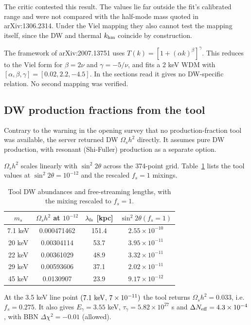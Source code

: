 \documentclass[11pt,a4paper]{article}
\begin{document}
The critic contested this result. The values lie far outside the fit's calibrated range and were not compared with the half-mode mass quoted in arXiv:1306.2314. Under the Viel mapping they also cannot test the mapping itself, since the DW and thermal $k_{\rm hm}$ coincide by construction.

The framework of arXiv:2007.13751 uses $T(k)=[1+(\alpha k)^\beta]^\gamma$. This reduces to the Viel form for $\beta=2\nu$ and $\gamma=-5/\nu$, and fits a 2 keV WDM with $[\alpha,\beta,\gamma]=[0.02,2.2,-4.5]$. In the sections read it gives no DW-specific relation. No second mapping was verified.

\subsection{DW production fractions from the tool}
Contrary to the warning in the opening survey that no production-fraction tool was available, the server returned DW $\Omega_s h^2$ directly. It assumes pure DW production, with resonant (Shi-Fuller) production as a separate option.

$\Omega_s h^2$ scales linearly with $\sin^2 2\theta$ across the 374-point grid. Table~\ref{tab:fs} lists the tool values at $\sin^2 2\theta=10^{-12}$ and the rescaled $f_s=1$ mixings.

\begin{table}[h]
\centering
\begin{tabular}{cccc}
\toprule
$m_s$ & $\Omega_s h^2$ at $10^{-12}$ & $\lambda_{\rm fs}$ [kpc] & $\sin^2 2\theta(f_s=1)$ \\
\midrule
7.1 keV & 0.000471462 & 151.4 & $2.55\times10^{-10}$ \\
20 keV & 0.00304114 & 53.7 & $3.95\times10^{-11}$ \\
22 keV & 0.00361029 & 48.9 & $3.32\times10^{-11}$ \\
29 keV & 0.00593606 & 37.1 & $2.02\times10^{-11}$ \\
45 keV & 0.0130907 & 23.9 & $9.17\times10^{-12}$ \\
\bottomrule
\end{tabular}
\caption{Tool DW abundances and free-streaming lengths, with the mixing rescaled to $f_s=1$.}
\label{tab:fs}
\end{table}

At the 3.5 keV line point $(7.1\ {\rm keV},\,7\times10^{-11})$ the tool returns $\Omega_s h^2=0.033$, i.e.\ $f_s=0.275$. It also gives $E_\gamma=3.55$ keV, $\tau_\gamma=5.82\times10^{27}$ s and $\Delta N_{\rm eff}=4.3\times10^{-4}$, with BBN $\Delta\chi^2=-0.01$ (allowed).
\end{document}
